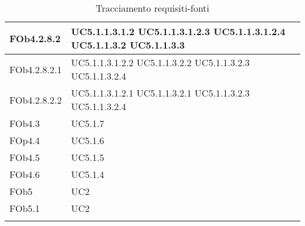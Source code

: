 \begin{longtable}{|l|l|}
\hline
FOb4.2.8.2 & UC5.1.1.3.1.2 \linebreak  UC5.1.1.3.1.2.3 \linebreak  UC5.1.1.3.1.2.4 \linebreak  UC5.1.1.3.2 \linebreak  UC5.1.1.3.3 \linebreak  \\ 
\hline
FOb4.2.8.2.1 & UC5.1.1.3.1.2.2 \linebreak  UC5.1.1.3.2.2 \linebreak  UC5.1.1.3.2.3 \linebreak  UC5.1.1.3.2.4 \linebreak  \\ 
\hline
FOb4.2.8.2.2 & UC5.1.1.3.1.2.1 \linebreak  UC5.1.1.3.2.1 \linebreak  UC5.1.1.3.2.3 \linebreak  UC5.1.1.3.2.4 \linebreak  \\ 
\hline
FOb4.3 & UC5.1.7 \linebreak  \\ 
\hline
FOp4.4 & UC5.1.6 \linebreak  \\ 
\hline
FOb4.5 & UC5.1.5 \linebreak  \\ 
\hline
FOb4.6 & UC5.1.4 \linebreak  \\ 
\hline
FOb5 & UC2 \linebreak \\ 
\hline
FOb5.1 & UC2 \linebreak  \\ 
\hline
\caption{Tracciamento requisiti-fonti}
\end{longtable}
	
